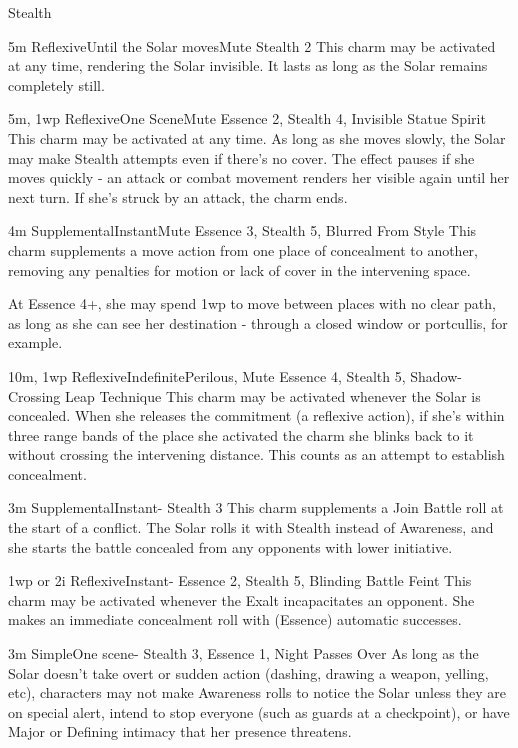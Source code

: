 \begin{Ability}{Stealth}

  {5m}
  {Reflexive}{Until the Solar moves}{Mute}
  {Stealth 2}
  This charm may be activated at any time, rendering the Solar invisible. It lasts as long as the Solar remains completely still.

  {5m, 1wp}
  {Reflexive}{One Scene}{Mute}
  {Essence 2, Stealth 4, Invisible Statue Spirit}
  This charm may be activated at any time. As long as she moves slowly, the Solar may make Stealth attempts even if there's no cover. The effect pauses if she moves quickly - an attack or combat movement renders her visible again until her next turn. If she's struck by an attack, the charm ends.

  {4m}
  {Supplemental}{Instant}{Mute}
  {Essence 3, Stealth 5, Blurred From Style}
  This charm supplements a move action from one place of concealment to another, removing any penalties for motion or lack of cover in the intervening space.

  At Essence 4+, she may spend 1wp to move between places with no clear path, as long as she can see her destination - through a closed window or portcullis, for example.

  {10m, 1wp}
  {Reflexive}{Indefinite}{Perilous, Mute}
  {Essence 4, Stealth 5, Shadow-Crossing Leap Technique}
  This charm may be activated whenever the Solar is concealed. When she releases the commitment (a reflexive action), if she's within three range bands of the place she activated the charm she blinks back to it without crossing the intervening distance. This counts as an attempt to establish concealment.

  {3m}
  {Supplemental}{Instant}{-}
  {Stealth 3}
  This charm supplements a Join Battle roll at the start of a conflict. The Solar rolls it with Stealth instead of Awareness, and she starts the battle concealed from any opponents with lower initiative.

  {1wp or 2i}
  {Reflexive}{Instant}{-}
  {Essence 2, Stealth 5, Blinding Battle Feint}
  This charm may be activated whenever the Exalt incapacitates an opponent. She makes an immediate concealment roll with (Essence) automatic successes.

  {3m}
  {Simple}{One scene}{-}
  {Stealth 3, Essence 1, Night Passes Over}
  As long as the Solar doesn't take overt or sudden action (dashing, drawing a weapon, yelling, etc), characters may not make Awareness rolls to notice the Solar unless they are on special alert, intend to stop everyone (such as guards at a checkpoint), or have Major or Defining intimacy that her presence threatens.


\end{Ability}
